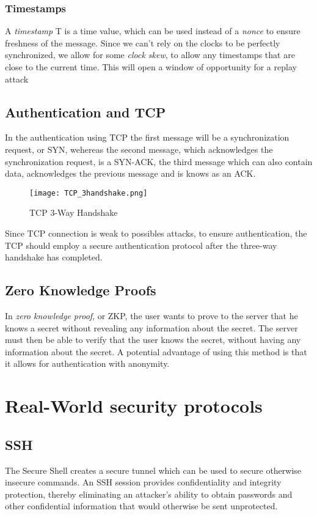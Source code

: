 \documentclass{article}
\begin{document}
\subsubsection{Timestamps}
A \textit{timestamp} T is a time value, which can be used instead of a \textit{nonce} to ensure freshness of the message. Since we can't rely on the clocks to be perfectly synchronized, we allow for some \textit{clock skew}, to allow any timestamps that are close to the current time. This will open a window of opportunity for a replay attack

\subsection{Authentication and TCP}
In the authentication using TCP the first message will be a synchronization request, or SYN, wehereas the second message, which acknowledges the synchronization request, is a SYN-ACK, the third message which can also contain data, acknowledges the previous message and is knows as an ACK.\\
\begin{figure}[H]
    \centering
    \texttt{[image: TCP\_3handshake.png]}
    \caption{TCP 3-Way Handshake}
\end{figure}
Since TCP connection is weak to possibles attacks, to ensure authentication, the TCP should employ a secure authentication protocol after the three-way handshake has completed.

\subsection{Zero Knowledge Proofs}
In \textit{zero knowledge proof}, or ZKP, the user wants to prove to the server that he knows a secret without revealing any information about the secret. The server must then be able to verify that the user knows the secret, without having any information about the secret. A potential advantage of using this method is that it allows for authentication with anonymity.

\newpage
\section{Real-World security protocols}
\subsection{SSH}
The Secure Shell creates a secure tunnel which can be used to secure otherwise insecure commands. An SSH session provides confidentiality and integrity protection, thereby eliminating an attacker's ability to obtain passwords and other confidential information that would otherwise be sent unprotected.
\end{document}
